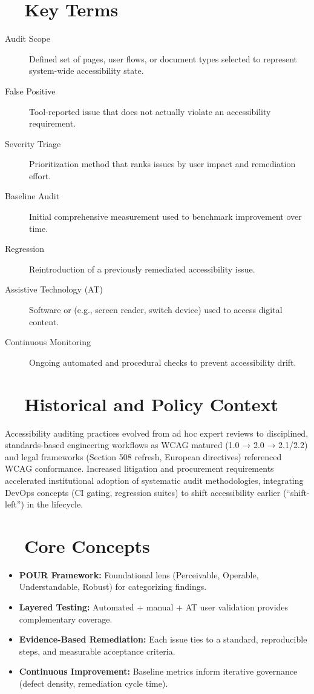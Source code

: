 \section{~~Key Terms}\label{sec:key-terms-auditing}
\begin{description}
	\item[Audit Scope] Defined set of pages, user flows, or document types selected to represent system-wide accessibility state.
	\item[False Positive] Tool-reported issue that does not actually violate an accessibility requirement.
	\item[Severity Triage] Prioritization method that ranks issues by user impact and remediation effort.
	\item[Baseline Audit] Initial comprehensive measurement used to benchmark improvement over time.
	\item[Regression] Reintroduction of a previously remediated accessibility issue.
	\item[Assistive Technology (AT)] Software or  (e.g., screen reader, switch device) used to access digital content.
	\item[Continuous Monitoring] Ongoing automated and procedural checks to prevent accessibility drift.
\end{description}

\section{~~Historical and Policy Context}\label{sec:historical-policy-auditing}
Accessibility auditing practices evolved from ad hoc expert reviews to disciplined, standards-based engineering workflows as WCAG matured (1.0 → 2.0 → 2.1/2.2) and legal frameworks (Section 508 refresh, European directives) referenced WCAG conformance. Increased litigation and procurement requirements accelerated institutional adoption of systematic audit methodologies, integrating DevOps concepts (CI gating, regression suites) to shift accessibility earlier (“shift-left”) in the lifecycle.

\section{~~Core Concepts}\label{sec:core-concepts-auditing}
\begin{itemize}
	\item \textbf{POUR Framework:} Foundational lens (Perceivable, Operable, Understandable, Robust) for categorizing findings.
	\item \textbf{Layered Testing:} Automated + manual + AT user validation provides complementary coverage.
	\item \textbf{Evidence-Based Remediation:} Each issue ties to a standard, reproducible steps, and measurable acceptance criteria.
	\item \textbf{Continuous Improvement:} Baseline metrics inform iterative governance (defect density, remediation cycle time).
\end{itemize}


